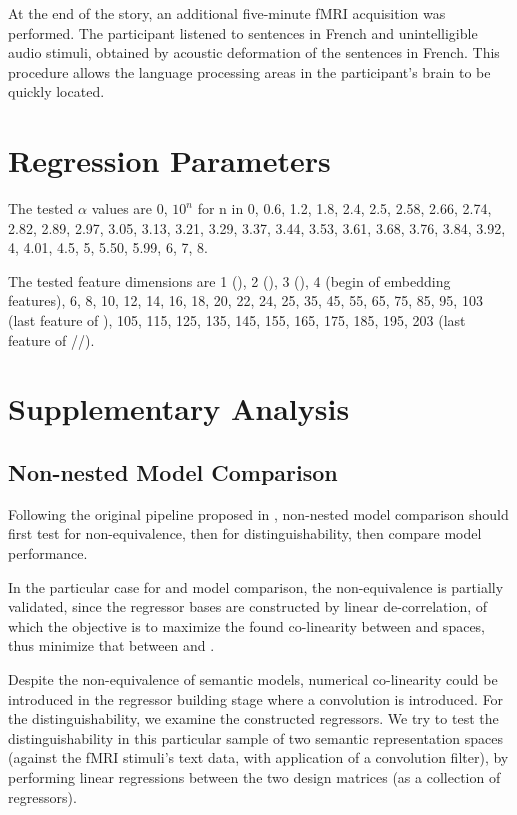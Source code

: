 At the end of the story, an additional five-minute fMRI acquisition was performed. The participant listened to sentences in French and unintelligible audio stimuli, obtained by acoustic deformation of the sentences in French. This procedure allows the language processing areas in the participant's brain to be quickly located.


\section{Regression Parameters}
\label{appsubsec:regressionparameters}

The tested \(\alpha\) values are 0, \(10^n\) for n in 0, 0.6, 1.2, 1.8, 2.4, 2.5, 2.58, 2.66, 2.74, 2.82, 2.89, 2.97, 3.05, 3.13, 3.21, 3.29, 3.37, 3.44, 3.53, 3.61, 3.68, 3.76, 3.84, 3.92, 4, 4.01, 4.5, 5, 5.50, 5.99, 6, 7, 8.

The tested feature dimensions are  1 (),   2 (),   3 (),   4 (begin of embedding features),   6,   8,  10,  12,  14,  16,  18,  20,  22,
        24,  25,  35,  45,  55,  65,  75,  85,  95, 103 (last feature of ), 105,  115, 125, 135,
       145, 155, 165, 175, 185, 195, 203 (last feature of \slash{}\slash{}).



\section{Supplementary Analysis}
\subsection{Non-nested Model Comparison} 
\label{appsubsec:nonnestedcompmeth}
Following the original pipeline proposed in \textcite{merkleTestingNonnestedStructural2016}, non-nested model comparison should first test for non-equivalence, then for distinguishability, then compare model performance. 

In the particular case for  and  model comparison, the non-equivalence is partially validated, since the regressor bases are constructed by linear de-correlation, of which the objective is to maximize the found co-linearity between  and  spaces, thus minimize that between  and .

Despite the non-equivalence of semantic models, numerical co-linearity could be introduced in the regressor building stage where a convolution is introduced. For the distinguishability, we examine the constructed regressors. We try to test the distinguishability in this particular sample of two semantic representation spaces (against the fMRI stimuli's text data, with application of a convolution filter), by performing linear regressions between the two design matrices (as a collection of regressors). 

